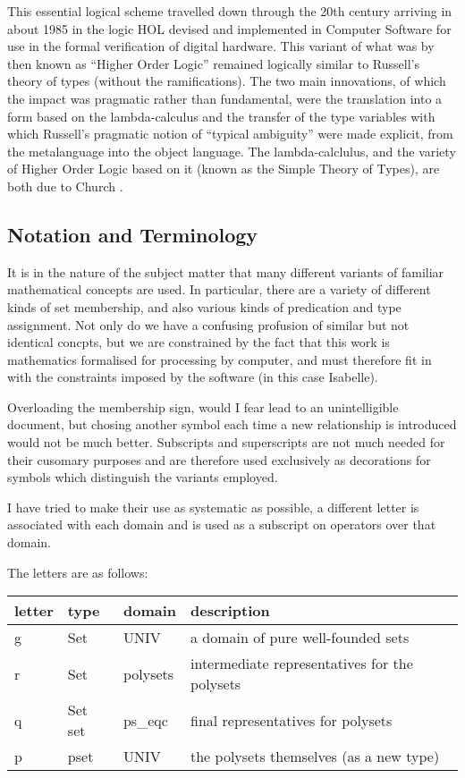 \documentclass[11pt,a4paper]{article}
\begin{document}
This essential logical scheme travelled down through the 20th century arriving in about 1985 in the logic HOL devised and implemented in Computer Software for use in the formal verification of digital hardware.
This variant of what was by then known as ``Higher Order Logic'' remained logically similar to Russell's theory of types (without the ramifications).
The two main innovations, of which the impact was pragmatic rather than fundamental, were the translation into a form based on the lambda-calculus and the transfer of the type variables with which Russell's pragmatic notion of ``typical ambiguity'' were made explicit, from the metalanguage into the object language.
The lambda-calclulus, and the variety of Higher Order Logic based on it (known as the Simple Theory of Types), are both due to Church \cite{church36,church40}.

\subsection{Notation and Terminology}

It is in the nature of the subject matter that many different variants of familiar mathematical concepts are used.
In particular, there are a variety of different kinds of set membership, and also various kinds of predication and type assignment.
Not only do we have a confusing profusion of similar but not identical concpts, but we are constrained by the fact that this work is mathematics formalised for processing by computer, and must therefore fit in with the constraints imposed by the software (in this case Isabelle).

Overloading the membership sign, would I fear lead to an unintelligible document, but chosing another symbol each time a new relationship is introduced would not be much better.
Subscripts and superscripts are not much needed for their cusomary purposes and are therefore used exclusively as decorations for symbols which distinguish the variants employed.

I have tried to make their use as systematic as possible, a different letter is associated with each domain and is used as a subscript on operators over that domain.

The letters are as follows:

\begin{centering}
\begin{tabular}{| l | l | l | l |}
\hline
letter & type & domain & description \\
\hline
g & Set & UNIV & a domain of pure well-founded sets \\
r & Set & polysets & intermediate representatives for the polysets \\
q & Set set & ps\_eqc & final representatives for polysets \\
p & pset & UNIV & the polysets themselves (as a new type) \\
\hline
\end{tabular}
\end{centering}
\end{document}
